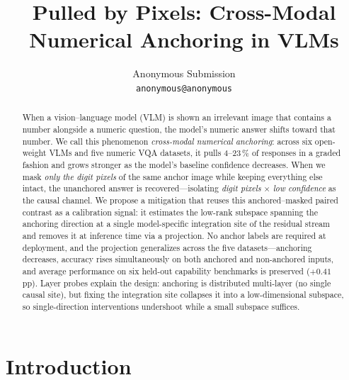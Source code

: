 \documentclass[11pt]{article}
\title{Pulled by Pixels: Cross-Modal Numerical Anchoring in VLMs}
\author{Anonymous Submission \\
  \texttt{anonymous@anonymous} \\}
\begin{document}
\maketitle

\begin{abstract}
When a vision--language model (VLM) is shown an irrelevant image that contains a number alongside a numeric question, the model's numeric answer shifts toward that number. We call this phenomenon \textit{cross-modal numerical anchoring}: across six open-weight VLMs and five numeric VQA datasets, it pulls 4--23\,\% of responses in a graded fashion and grows stronger as the model's baseline confidence decreases. When we mask \textit{only the digit pixels} of the same anchor image while keeping everything else intact, the unanchored answer is recovered---isolating \textit{digit pixels} $\times$ \textit{low confidence} as the causal channel. We propose a mitigation that reuses this anchored--masked paired contrast as a calibration signal: it estimates the low-rank subspace spanning the anchoring direction at a single model-specific integration site of the residual stream and removes it at inference time via a projection. No anchor labels are required at deployment, and the projection generalizes across the five datasets---anchoring decreases, accuracy rises simultaneously on both anchored and non-anchored inputs, and average performance on six held-out capability benchmarks is preserved ($+0.41$\,pp). Layer probes explain the design: anchoring is distributed multi-layer (no single causal site), but fixing the integration site collapses it into a low-dimensional subspace, so single-direction interventions undershoot while a small subspace suffices.
\end{abstract}

\section{Introduction}
\end{document}
